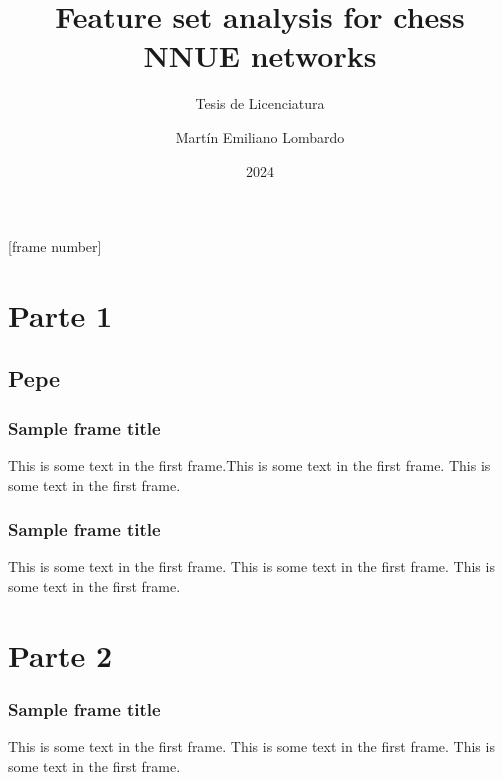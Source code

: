 \title{Feature set analysis for chess NNUE networks}
\subtitle{Tesis de Licenciatura}
\author{Martín Emiliano Lombardo}
\date{2024}

[frame number]{}



\frame{\titlepage}

\section{Parte 1}

\subsection{Pepe}

\begin{frame}
\frametitle{Sample frame title}
This is some text in the first frame.\pause This is some text in the first frame. This is some text in the first frame.
\end{frame}

\begin{frame}
\frametitle{Sample frame title}
This is some text in the first frame. This is some text in the first frame. \pause This is some text in the first frame.
\end{frame}

\section{Parte 2}

\begin{frame}
\frametitle{Sample frame title}
This is some text in the first frame. This is some text in the first frame. This is some text in the first frame.
\end{frame}


